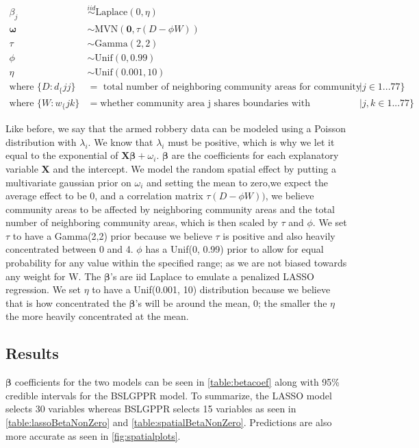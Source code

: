 \documentclass{article} %
\begin{document}
$$
\begin{aligned}
\beta_j &\overset{iid}{\sim} \text{Laplace}(0, \eta)\\
\boldsymbol{\omega} &\sim \text{MVN}(\mathbf{0}, \tau(D -\phi W))\\
\tau &\sim \text{Gamma}(2,2)\\
\phi &\sim \text{Unif}(0,0.99)\\
\eta &\sim \text{Unif}(0.001,10)\\
\text{where } \{D:d_\{jj\} &= \text{ total number of neighboring community areas for community area j}| j \in 1...77\} \\  
\text{where } \{W:w_\{jk\} &= \text{whether community area j shares boundaries with community area k}| j,k \in 1...77\}
\end{aligned}
$$

Like before, we say that the armed robbery data can be modeled using a Poisson distribution with $\lambda_i$. We know that $\lambda_i$ must be positive, which is why we let it equal to the exponential of $\mathbf{X}\boldsymbol{\beta} + \omega_i$. $\boldsymbol{\beta}$ are the coefficients for each explanatory variable $\mathbf{X}$ and the intercept. We model the random spatial effect by putting a multivariate gaussian prior on $\omega_i$ and setting the mean to zero,we expect the average effect to be 0, and a correlation matrix $\tau(D -\phi W))$, we believe community areas to be affected by neighboring community areas and the total number of neighboring community areas, which is then scaled by $\tau$ and $\phi$. We set $\tau$ to have a Gamma(2,2) prior because we believe $\tau$ is positive and also heavily concentrated between 0 and 4. $\phi$ has a Unif(0, 0.99) prior to allow for equal probability for any value within the specified range; as we are not biased towards any weight for W. The $\boldsymbol{\beta}$’s are iid Laplace to emulate a penalized LASSO regression. We set $\eta$ to have a Unif(0.001, 10) distribution because we believe that is how concentrated the $\boldsymbol{\beta}$'s will be around the mean, 0; the smaller the $\eta$ the more heavily concentrated at the mean. 



\subsection{Results}

$\boldsymbol{\beta}$ coefficients for the two models can be seen in \autoref{table:betacoef} along with 95\% credible intervals for the BSLGPPR model. To summarize, the LASSO model selects 30 variables whereas BSLGPPR selects 15 variables as seen in \autoref{table:lassoBetaNonZero} and \autoref{table:spatialBetaNonZero}. Predictions are also more accurate as seen in \autoref{fig:spatialplots}. 
\end{document}
